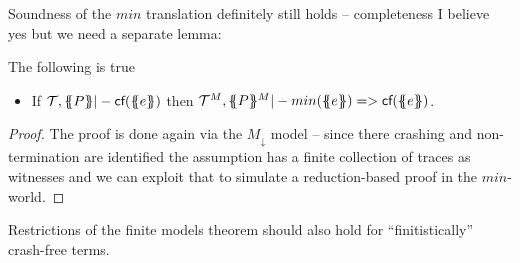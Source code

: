 \documentclass[preprint]{sigplanconf}
\begin{document}
Soundness of the $min$ translation definitely still holds -- completeness I believe yes but 
we need a separate lemma:

\begin{lemma} The following is true
\begin{itemize}
  \item If $\Th,\ptrans{}{P} |- \lcf{\etrans{}{}{e}}$ then 
           $\Th^M,\ptrans{}{P}^M |- min(\etrans{}{}{e}) => \lcf{\etrans{}{}{e}}$.
\end{itemize}
\end{lemma}
\begin{proof} The proof is done again via the $M_\downarrow$ model -- since there 
crashing and non-termination are identified the assumption has a finite collection of traces 
as witnesses and we can exploit that to simulate a reduction-based proof in the $min$-world.
\end{proof}

Restrictions of the finite models theorem should also hold for ``finitistically'' 
crash-free terms.





\end{document}
